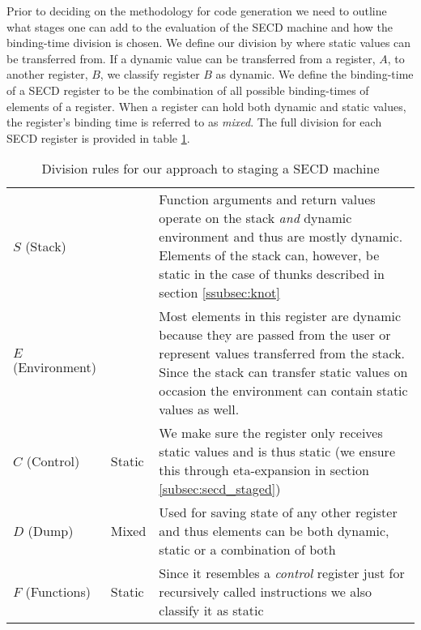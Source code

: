\documentclass[a4paper,12pt,twoside,openright]{report}
\theoremstyle{definition}
\begin{document}
Prior to deciding on the methodology for code generation we need to outline what stages one can add to the evaluation of the SECD machine and how the binding-time division is chosen. We define our division by where static values can be transferred from. If a dynamic value can be transferred from a register, $A$, to another register, $B$, we classify register $B$ as dynamic. We define the binding-time of a SECD register to be the combination of all possible binding-times of elements of a register. When a register can hold both dynamic and static values, the register's binding time is referred to as \textit{mixed}. The full division for each SECD register is provided in table \ref{tbl:secd_division}.

\begin{table}[!htbp]
  \centering
  \begin{tabular}{|p{3cm}|p{3cm}|p{6cm}|}
 	\hline
 	\thead{SECD Register}	&	\thead{Classification}	&	\thead{Reason}	\\ \hline
	$S$ (Stack)				&	\vtop{\hbox{\strut Mixed}\hbox{\strut (mostly dynamic)}}				&	Function arguments and return values operate on the stack \textit{and} dynamic environment and thus are mostly dynamic. Elements of the stack can, however, be static in the case of thunks described in section \ref{ssubsec:knot} \\ \hline

	$E$ (Environment)		&	\vtop{\hbox{\strut Mixed}\hbox{\strut (mostly dynamic)}}	&	 Most elements in this register are dynamic because they are passed from the user or represent values transferred from the stack. Since the stack can transfer static values on occasion the environment can contain static values as well. \\ \hline

	$C$ (Control)				&	Static				& We make sure the register only receives static values and is thus static (we ensure this through eta-expansion in section \ref{subsec:secd_staged})  \\ \hline

	$D$ (Dump)				&	Mixed				&	Used for saving state of any other register and thus elements can be both dynamic, static or a combination of both \\ \hline

	$F$ (Functions)		&	Static				&	Since it resembles a \textit{control} register just for recursively called instructions we also classify it as static \\

	\hline
  \end{tabular}
  \caption{Division rules for our approach to staging a SECD machine}
  \label{tbl:secd_division}
\end{table}
\end{document}
